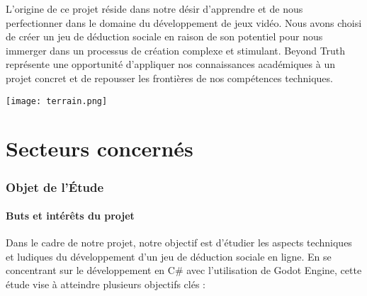 \documentclass[
	article,			%
	11pt,				%
	oneside,			%
	a4paper,			%
	chapter=TITLE,
	french,			%
	sumario=tradicional
	]{base_nt}
\begin{document}
L'origine de ce projet réside dans notre désir d'apprendre et de nous perfectionner dans le domaine du développement de jeux vidéo. Nous avons choisi de créer un jeu de déduction sociale en raison de son potentiel pour nous immerger dans un processus de création complexe et stimulant. Beyond Truth représente une opportunité d'appliquer nos connaissances académiques à un projet concret et de repousser les frontières de nos compétences techniques.

\vspace{2.3cm}
\texttt{[image: terrain.png]}

\part{Secteurs concernés}
\section{Objet de l'Étude}

\subsection{Buts et intérêts du projet}

Dans le cadre de notre projet, notre objectif est d'étudier les aspects techniques et ludiques du développement d'un jeu de déduction sociale en ligne. En se concentrant sur le développement en C\# avec l'utilisation de Godot Engine, cette étude vise à atteindre plusieurs objectifs clés :
\end{document}
